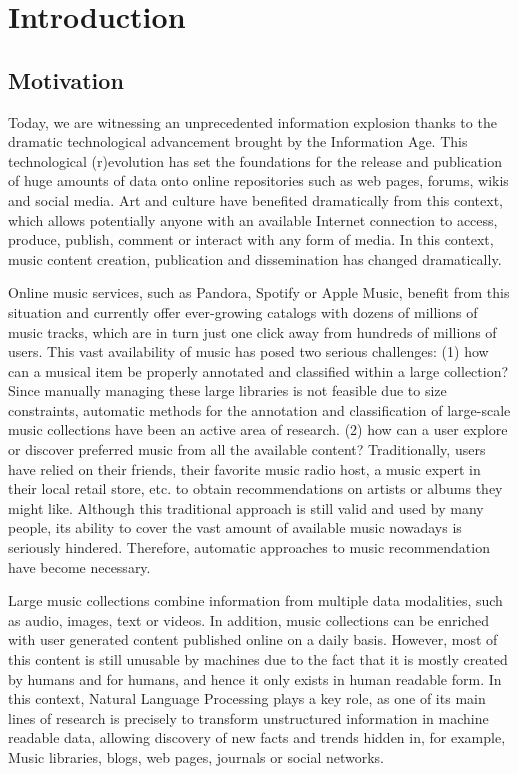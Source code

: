 
\chapter{Introduction}
\label{sec:intro}

\section{Motivation}
\label{sec:intro:motivation}

Today, we are witnessing an unprecedented information explosion thanks to the dramatic technological advancement brought by the Information Age. This technological (r)evolution has set the foundations for the release and publication of huge amounts of data onto online repositories such as web pages, forums, wikis and social media. Art and culture have benefited dramatically from this context, which allows potentially anyone with an available Internet connection to access, produce, publish, comment or interact with any form of media. 
In this context, music content creation, publication and dissemination has changed dramatically. 

Online music services, such as Pandora, Spotify or Apple Music, benefit from this situation and currently offer ever-growing catalogs with dozens of millions of music tracks, which are in turn just one click away from hundreds of millions of users. This vast availability of music has posed two serious challenges: (1) how can a musical item be properly annotated and classified within a large collection? Since manually managing these large libraries is not feasible due to size constraints, automatic methods for the annotation and classification of large-scale music collections have been an active area of research. (2) how can a user explore or discover preferred music from all the available content? Traditionally, users have relied on their friends, their favorite music radio host, a music expert in their local retail store, etc. to obtain recommendations on artists or albums they might like. Although this traditional approach is still valid and used by many people, its ability to cover the vast amount of available music nowadays is seriously hindered. Therefore, automatic approaches to music recommendation have become necessary.

Large music collections combine information from multiple data modalities, such as audio, images, text or videos. In addition, music collections can be enriched with user generated content published online on a daily basis. However, most of this content is still unusable by machines due to the fact that it is mostly created by humans and for humans, and hence it only exists in human readable form. In this context, Natural Language Processing plays a key role, as one of its main lines of research is precisely to transform unstructured information in machine readable data, allowing discovery of new facts and trends hidden in, for example, Music libraries, blogs, web pages, journals or social networks.

